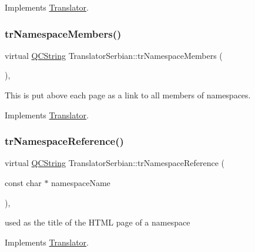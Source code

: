Implements \mbox{\hyperlink{class_translator}{Translator}}.

\mbox{\label{class_translator_serbian_aed20527aa9f88f29bc5f685db1315a7c}} 
\subsubsection{\texorpdfstring{trNamespaceMembers()}{trNamespaceMembers()}}
{\footnotesize\ttfamily virtual \mbox{\hyperlink{class_q_c_string}{Q\+C\+String}} Translator\+Serbian\+::tr\+Namespace\+Members (\begin{DoxyParamCaption}{ }\end{DoxyParamCaption})\hspace{0.3cm}{\ttfamily [inline]}, {\ttfamily [virtual]}}

This is put above each page as a link to all members of namespaces. 

Implements \mbox{\hyperlink{class_translator}{Translator}}.

\mbox{\label{class_translator_serbian_a38ce36fd281fa65f02a5840aaaf7e770}} 
\subsubsection{\texorpdfstring{trNamespaceReference()}{trNamespaceReference()}}
{\footnotesize\ttfamily virtual \mbox{\hyperlink{class_q_c_string}{Q\+C\+String}} Translator\+Serbian\+::tr\+Namespace\+Reference (\begin{DoxyParamCaption}\item[{const char $\ast$}]{namespace\+Name }\end{DoxyParamCaption})\hspace{0.3cm}{\ttfamily [inline]}, {\ttfamily [virtual]}}

used as the title of the H\+T\+ML page of a namespace 

Implements \mbox{\hyperlink{class_translator}{Translator}}.

\mbox{\label{class_translator_serbian_aafd98ed940f0263346635bb228ea4de0}} 
